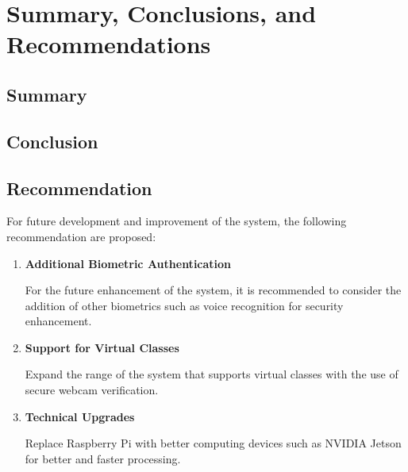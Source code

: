 \chapter{Summary, Conclusions, and Recommendations}

\section{Summary}

\section{Conclusion}

\section{Recommendation}
	For future development and improvement of the system, the following recommendation are proposed:
	
	\begin{enumerate}
		\item \textbf{Additional Biometric Authentication}
	
		For the future enhancement of the system, it is recommended to consider the addition of other biometrics such as voice recognition for security enhancement.
		
		\item \textbf{Support for Virtual Classes}
		
		Expand the range of the system that supports virtual classes with the use of secure webcam verification.
		
		\item \textbf{Technical Upgrades}
		
		Replace Raspberry Pi with better computing devices such as NVIDIA Jetson for better and faster processing.
		
	\end{enumerate}
	